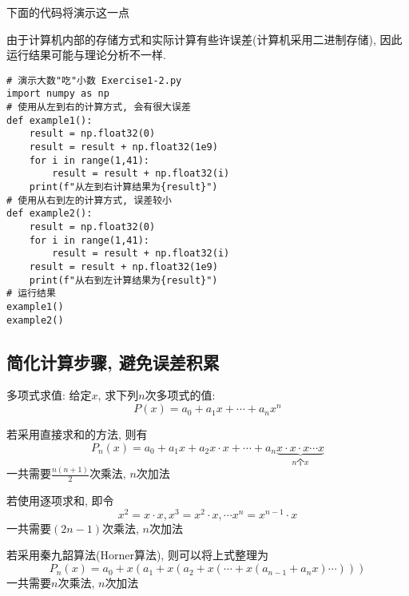 下面的代码将演示这一点

\begin{notice}
    由于计算机内部的存储方式和实际计算有些许误差(计算机采用二进制存储), 因此运行结果可能与理论分析不一样.
\end{notice}

\begin{lstlisting}
# 演示大数"吃"小数 Exercise1-2.py
import numpy as np
# 使用从左到右的计算方式, 会有很大误差
def example1():
    result = np.float32(0)
    result = result + np.float32(1e9)
    for i in range(1,41):
        result = result + np.float32(i)
    print(f"从左到右计算结果为{result}")
# 使用从右到左的计算方式, 误差较小
def example2():
    result = np.float32(0)
    for i in range(1,41):
        result = result + np.float32(i)
    result = result + np.float32(1e9)
    print(f"从右到左计算结果为{result}")
# 运行结果
example1()
example2()
\end{lstlisting}

\subsection{简化计算步骤, 避免误差积累}
\begin{example}
    多项式求值: 给定$x$, 求下列$n$次多项式的值:
    \begin{equation*}
        P(x) = a_0+a_1x+\cdots+a_nx^n
    \end{equation*}
\end{example}

\begin{solution}
    若采用直接求和的方法, 则有
    \begin{equation*}
        P_n(x)=a_0+a_1x+a_2x\cdot x+\cdots+a_n\underbrace{x\cdot x\cdot x\cdots x}_{n\text{个}x}
    \end{equation*}
    一共需要$\frac{n(n+1)}{2}$次乘法, $n$次加法

    若使用逐项求和, 即令
    \begin{equation*}
        x^2=x\cdot x, x^3 = x^2 \cdot x, \cdots x^n = x^{n-1}\cdot x
    \end{equation*}
    一共需要$(2n-1)$次乘法, $n$次加法

    若采用秦九韶算法(Horner算法), 则可以将上式整理为
    \begin{equation*}
        P_n(x) = a_0+x(a_1+x(a_2+x(\cdots+x(a_{n-1}+a_nx)\cdots)))
    \end{equation*}
    一共需要$n$次乘法, $n$次加法
\end{solution}

